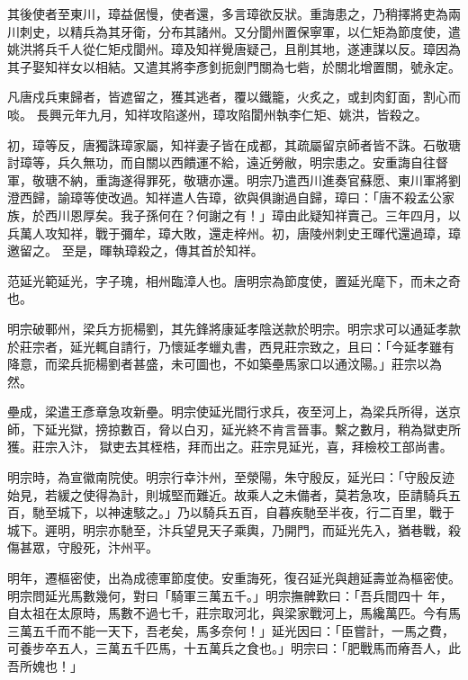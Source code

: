 \begin{pinyinscope}
 其後使者至東川，璋益倨慢，使者還，多言璋欲反狀。重誨患之，乃稍擇將吏為兩川刺史，以精兵為其牙衛，分布其諸州。又分閬州置保寧軍，以仁矩為節度使，遣姚洪將兵千人從仁矩戍閬州。璋及知祥覺唐疑己，且削其地，遂連謀以反。璋因為其子娶知祥女以相結。又遣其將李彥釗扼劍門關為七砦，於關北增置關，號永定。



 凡唐戍兵東歸者，皆遮留之，獲其逃者，覆以鐵籠，火炙之，或刲肉釘面，割心而啖。
 長興元年九月，知祥攻陷遂州，璋攻陷閬州執李仁矩、姚洪，皆殺之。



 初，璋等反，唐獨誅璋家屬，知祥妻子皆在成都，其疏屬留京師者皆不誅。石敬瑭討璋等，兵久無功，而自關以西饋運不給，遠近勞敝，明宗患之。安重誨自往督軍，敬瑭不納，重誨遂得罪死，敬瑭亦還。明宗乃遣西川進奏官蘇愿、東川軍將劉澄西歸，諭璋等使改過。知祥遣人告璋，欲與俱謝過自歸，璋曰：「唐不殺孟公家族，於西川恩厚矣。我子孫何在？何謝之有！」璋由此疑知祥賣己。三年四月，以兵萬人攻知祥，戰于彌牟，璋大敗，還走梓州。初，唐陵州刺史王暉代還過璋，璋邀留之。
 至是，暉執璋殺之，傳其首於知祥。



 范延光範延光，字子瑰，相州臨漳人也。唐明宗為節度使，置延光麾下，而未之奇也。



 明宗破鄆州，梁兵方扼楊劉，其先鋒將康延孝陰送款於明宗。明宗求可以通延孝款於莊宗者，延光輒自請行，乃懷延孝蠟丸書，西見莊宗致之，且曰：「今延孝雖有降意，而梁兵扼楊劉者甚盛，未可圖也，不如築壘馬家口以通汶陽。」莊宗以為然。



 壘成，梁遣王彥章急攻新壘。明宗使延光間行求兵，夜至河上，為梁兵所得，送京師，下延光獄，搒掠數百，脅以白刃，延光終不肯言晉事。繫之數月，稍為獄吏所獲。莊宗入汴，
 獄吏去其桎梏，拜而出之。莊宗見延光，喜，拜檢校工部尚書。



 明宗時，為宣徽南院使。明宗行幸汴州，至滎陽，朱守殷反，延光曰：「守殷反迹始見，若緩之使得為計，則城堅而難近。故乘人之未備者，莫若急攻，臣請騎兵五百，馳至城下，以神速駭之。」乃以騎兵五百，自暮疾馳至半夜，行二百里，戰于城下。遲明，明宗亦馳至，汴兵望見天子乘輿，乃開門，而延光先入，猶巷戰，殺傷甚眾，守殷死，汴州平。



 明年，遷樞密使，出為成德軍節度使。安重誨死，復召延光與趙延壽並為樞密使。明宗問延光馬數幾何，對曰「騎軍三萬五千。」明宗撫髀歎曰：「吾兵間四十
 年，自太祖在太原時，馬數不過七千，莊宗取河北，與梁家戰河上，馬纔萬匹。今有馬三萬五千而不能一天下，吾老矣，馬多奈何！」延光因曰：「臣嘗計，一馬之費，可養步卒五人，三萬五千匹馬，十五萬兵之食也。」明宗曰：「肥戰馬而瘠吾人，此吾所媿也！」




\end{pinyinscope}
